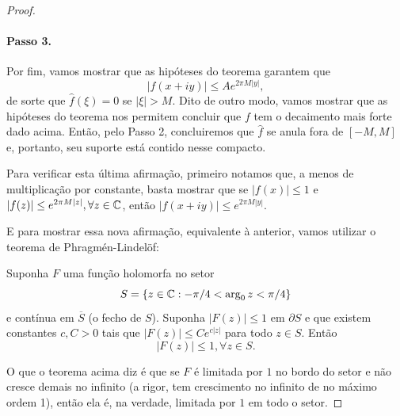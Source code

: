 \begin{proof}
            \paragraph{Passo 3.} Por fim, vamos mostrar que as hipóteses
            do teorema garantem que
            \begin{equation*}
                |f(x+iy)| \leq Ae^{2\pi M|y|},
            \end{equation*}
            de sorte que $\widehat{f}(\xi) = 0$ se $|\xi| > M$. Dito
            de outro modo, vamos mostrar que as hipóteses do teorema
            nos permitem concluir que $f$ tem o decaimento mais forte 
            dado acima.
            Então, pelo Passo 2, concluiremos que $\widehat{f}$
            se anula fora de $[-M,M]$ e, portanto, seu suporte está
            contido nesse compacto.
            
            Para verificar esta última afirmação, primeiro notamos que,
            a menos de multiplicação por constante, basta mostrar que se
            $|f(x)| \leq 1$ e $|f(z)| \leq e^{2\pi M|z|}, \forall z\in\mathbb{C}$,
            então $|f(x+iy)| \leq e^{2\pi M|y|}$.
            
            E para mostrar essa nova afirmação, equivalente à anterior,
            vamos utilizar o teorema de Phragmén-Lindelöf:
            \begin{teorema}
                Suponha $F$ uma função holomorfa no setor
                \begin{equation*}
                    S = \{ z\in\mathbb{C} : -\pi/4 < \arg_0 z < \pi/4 \}
                \end{equation*}
                e contínua em $\overline{S}$ (o fecho de $S$). Suponha
                $|F(z)| \leq 1$ em $\partial S$ e que existem constantes
                $c,C>0$ tais que $|F(z)| \leq Ce^{c|z|}$ para todo $z\in S$.
                Então
                \begin{equation*}
                    |F(z)| \leq 1, \forall z\in S.
                \end{equation*}
            \end{teorema}
            O que o teorema acima diz é que se $F$ é limitada por $1$ no
            bordo do setor e não cresce demais no infinito (a rigor, tem
            crescimento no infinito de no máximo ordem 1), então ela é,
            na verdade, limitada por $1$ em todo o setor.
            

\end{proof}
